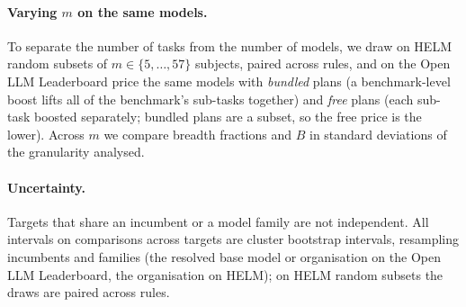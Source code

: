 \paragraph{Varying $m$ on the same models.}
To separate the number of tasks from the number of models, we draw on HELM random subsets of $m\in\{5,\dots,57\}$ subjects, paired across rules, and on the Open LLM Leaderboard price the same models with \emph{bundled} plans (a benchmark-level boost lifts all of the benchmark's sub-tasks together) and \emph{free} plans (each sub-task boosted separately; bundled plans are a subset, so the free price is the lower). Across $m$ we compare breadth fractions and $B$ in standard deviations of the granularity analysed.

\paragraph{Uncertainty.}
Targets that share an incumbent or a model family are not independent. All intervals on comparisons across targets are cluster bootstrap intervals, resampling incumbents and families (the resolved base model or organisation on the Open LLM Leaderboard, the organisation on HELM); on HELM random subsets the draws are paired across rules.

